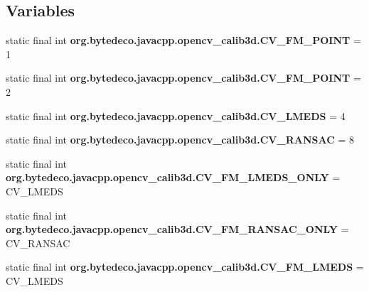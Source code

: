 \subsection*{Variables}
\begin{DoxyCompactItemize}
\item 
\mbox{\label{group__calib3d__c_ga6f0d0f2c916c3f216fd6bf356590e719}} 
static final int {\bfseries org.\+bytedeco.\+javacpp.\+opencv\+\_\+calib3d.\+C\+V\+\_\+\+F\+M\+\_\+P\+O\+I\+NT} = 1
\item 
\mbox{\label{group__calib3d__c_gaf5f15b1400463ee89a1564d1166e9dae}} 
static final int {\bfseries org.\+bytedeco.\+javacpp.\+opencv\+\_\+calib3d.\+C\+V\+\_\+\+F\+M\+\_\+P\+O\+I\+NT} = 2
\item 
\mbox{\label{group__calib3d__c_ga4cda277dfaa6451f5e7a7632c1b92678}} 
static final int {\bfseries org.\+bytedeco.\+javacpp.\+opencv\+\_\+calib3d.\+C\+V\+\_\+\+L\+M\+E\+DS} = 4
\item 
\mbox{\label{group__calib3d__c_gab4d58d8e7698d62f4abb1a014999321d}} 
static final int {\bfseries org.\+bytedeco.\+javacpp.\+opencv\+\_\+calib3d.\+C\+V\+\_\+\+R\+A\+N\+S\+AC} = 8
\item 
\mbox{\label{group__calib3d__c_ga891296bafba497e595300d155652fd76}} 
static final int {\bfseries org.\+bytedeco.\+javacpp.\+opencv\+\_\+calib3d.\+C\+V\+\_\+\+F\+M\+\_\+\+L\+M\+E\+D\+S\+\_\+\+O\+N\+LY} = C\+V\+\_\+\+L\+M\+E\+DS
\item 
\mbox{\label{group__calib3d__c_gacc37e6759ddedd68fb6ab929375cd07e}} 
static final int {\bfseries org.\+bytedeco.\+javacpp.\+opencv\+\_\+calib3d.\+C\+V\+\_\+\+F\+M\+\_\+\+R\+A\+N\+S\+A\+C\+\_\+\+O\+N\+LY} = C\+V\+\_\+\+R\+A\+N\+S\+AC
\item 
\mbox{\label{group__calib3d__c_ga8612979d4882499694ecf3a2b07c6053}} 
static final int {\bfseries org.\+bytedeco.\+javacpp.\+opencv\+\_\+calib3d.\+C\+V\+\_\+\+F\+M\+\_\+\+L\+M\+E\+DS} = C\+V\+\_\+\+L\+M\+E\+DS
\item 
\mbox{\label{group__calib3d__c_ga3dd58f89a4209796be643db88673701d}} 

\end{DoxyCompactItemize}
